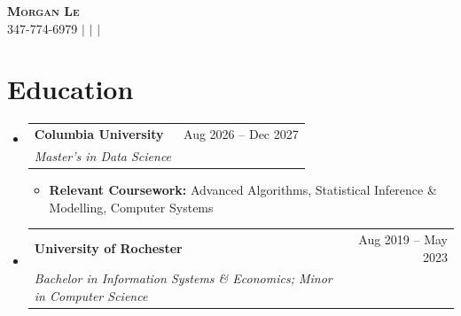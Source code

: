 \documentclass[a4paper,11pt]{article}
\makeatletter
\newcommand{\resumeItem}[1]{
  \item\small{
    {#1\par\vspace{-2pt}}
  }
}
\newcommand{\resumeSubheading}[4]{
  \vspace{-2pt}\item
    \begin{tabular*}{0.97\textwidth}[t]{l@{\extracolsep{\fill}}r}
      \textbf{#1} & #2 \\
      \textit{\small#3} & \textit{\small #4} \\
    \end{tabular*}\vspace{-7pt}
}
\newcommand{\resumeSubHeadingListStart}{\begin{itemize}[leftmargin=0.15in, label={}]}
\newcommand{\resumeSubHeadingListEnd}{\end{itemize}}
\newcommand{\resumeItemListStart}{\begin{itemize}}
\newcommand{\resumeItemListEnd}{\end{itemize}\vspace{-5pt}}
\makeatother
\begin{document}
\begin{center}
    \textbf{\Huge \scshape Morgan Le} \\ \vspace{1pt}
    \small 347-774-6979 $|$
    \href{mailto:ml5536@columbia.edu}{\underline{}} $|$
    \href{https://www.linkedin.com/in/morganhle/}{\underline{}} $|$
    \href{https://lhnminh.github.io/}{\underline{}}
\end{center}

\section{Education}
\resumeSubHeadingListStart
  \resumeSubheading
    {Columbia University}{Aug 2026 -- Dec 2027}
    {Master's in Data Science}{}
    \resumeItemListStart
      \resumeItem{\textbf{Relevant Coursework:} Advanced Algorithms, Statistical Inference \& Modelling, Computer Systems}
    \resumeItemListEnd
  \resumeSubheading
    {University of Rochester}{Aug 2019 -- May 2023}
    {Bachelor in Information Systems \& Economics; Minor in Computer Science}{}
\resumeSubHeadingListEnd
\end{document}
